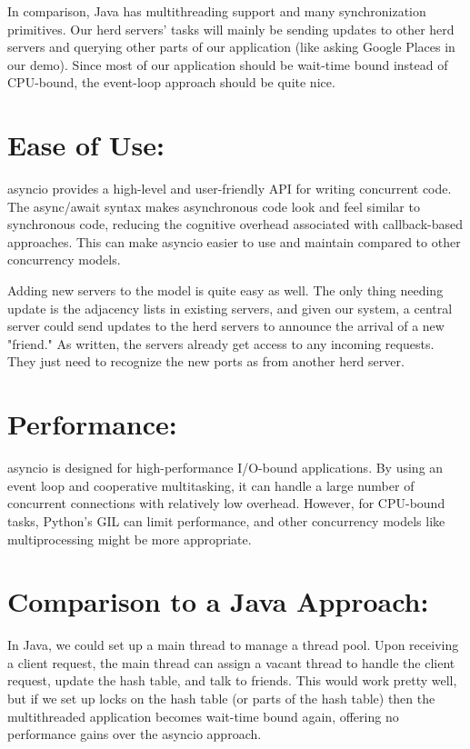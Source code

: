 In comparison, Java has multithreading support and many synchronization primitives. Our herd servers' tasks will mainly be sending updates to other herd servers and querying other parts of our application (like asking Google Places in our demo). Since most of our application should be wait-time bound instead of CPU-bound, the event-loop approach should be quite nice. 

\section{Ease of Use:}
asyncio provides a high-level and user-friendly API for writing concurrent code. The async/await syntax makes asynchronous code look and feel similar to synchronous code, reducing the cognitive overhead associated with callback-based approaches. This can make asyncio easier to use and maintain compared to other concurrency models.

Adding new servers to the model is quite easy as well. The only thing needing update is the adjacency lists in existing servers, and given our system, a central server could send updates to the herd servers to announce the arrival of a new "friend." As written, the servers already get access to any incoming requests. They just need to recognize the new ports as from another herd server.

\section{Performance:}
asyncio is designed for high-performance I/O-bound applications. By using an event loop and cooperative multitasking, it can handle a large number of concurrent connections with relatively low overhead. However, for CPU-bound tasks, Python's GIL can limit performance, and other concurrency models like multiprocessing might be more appropriate.

\section{Comparison to a Java Approach:}
In Java, we could set up a main thread to manage a thread pool. Upon receiving a client request, the main thread can assign a vacant thread to handle the client request, update the hash table, and talk to friends. This would work pretty well, but if we set up locks on the hash table (or parts of the hash table) then the multithreaded application becomes wait-time bound again, offering no performance gains over the asyncio approach. 


